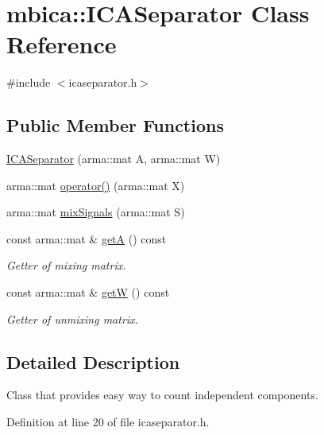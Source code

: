 \hypertarget{classmbica_1_1_i_c_a_separator}{
\section{mbica::ICASeparator Class Reference}
\label{classmbica_1_1_i_c_a_separator}
}


{\ttfamily \#include $<$icaseparator.h$>$}

\subsection*{Public Member Functions}
\begin{DoxyCompactItemize}
\item 
\hyperlink{classmbica_1_1_i_c_a_separator_ab1d0874ff943f2b3c04888768c032eb1}{ICASeparator} (arma::mat A, arma::mat W)
\item 
arma::mat \hyperlink{classmbica_1_1_i_c_a_separator_a1aa13483c85507e86ac9fe4465e709f7}{operator()} (arma::mat X)
\item 
arma::mat \hyperlink{classmbica_1_1_i_c_a_separator_aa6e102581e99e56bee0b21cf6be8fbe0}{mixSignals} (arma::mat S)
\item 
const arma::mat \& \hyperlink{classmbica_1_1_i_c_a_separator_a2ae50bb7ba10c9e177dc8d3d7e54dfdf}{getA} () const 
\begin{DoxyCompactList}\small\item\em Getter of mixing matrix. \item\end{DoxyCompactList}\item 
const arma::mat \& \hyperlink{classmbica_1_1_i_c_a_separator_ac9cc05d9ca89d9bdab7ba0dc9b9e3a69}{getW} () const 
\begin{DoxyCompactList}\small\item\em Getter of unmixing matrix. \item\end{DoxyCompactList}\end{DoxyCompactItemize}


\subsection{Detailed Description}
Class that provides easy way to count independent components. 

Definition at line 20 of file icaseparator.h.



